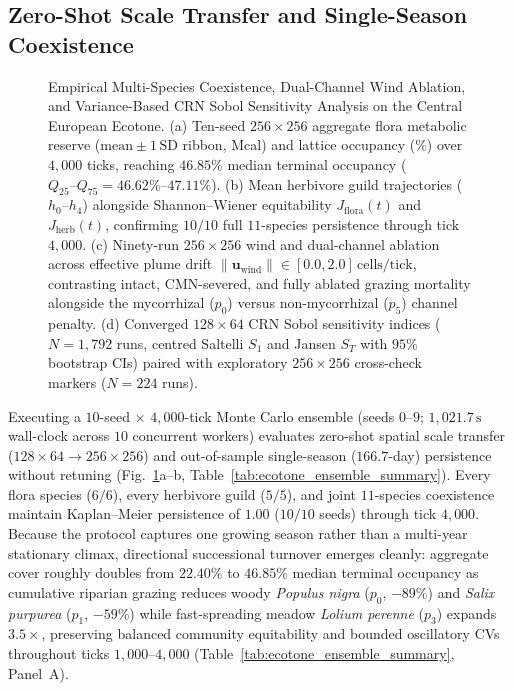 \subsection{Zero-Shot Scale Transfer and Single-Season Coexistence}
\label{sec:ecotone_coexistence}

\begin{figure}[t]
  \centering
  
  \caption{Empirical Multi-Species Coexistence, Dual-Channel Wind Ablation, and Variance-Based CRN Sobol Sensitivity Analysis on the Central European Ecotone. (a) Ten-seed $256 \times 256$ aggregate flora metabolic reserve ($\text{mean} \pm 1\,\text{SD}$ ribbon, Mcal) and lattice occupancy ($\%$) over $4{,}000$ ticks, reaching $46.85\%$ median terminal occupancy ($Q_{25}\text{--}Q_{75} = 46.62\%\text{--}47.11\%$). (b) Mean herbivore guild trajectories ($h_0$--$h_4$) alongside Shannon--Wiener equitability $J_{\mathrm{flora}}(t)$ and $J_{\mathrm{herb}}(t)$, confirming $10/10$ full $11$-species persistence through tick $4{,}000$. (c) Ninety-run $256 \times 256$ wind and dual-channel ablation across effective plume drift $\|\mathbf{u}_{\mathrm{wind}}\| \in [0.0, 2.0]\,\text{cells/tick}$, contrasting intact, CMN-severed, and fully ablated grazing mortality alongside the mycorrhizal ($p_0$) versus non-mycorrhizal ($p_5$) channel penalty. (d) Converged $128 \times 64$ CRN Sobol sensitivity indices ($N = 1{,}792$ runs, centred Saltelli $S_1$ and Jansen $S_T$ with $95\%$ bootstrap CIs) paired with exploratory $256 \times 256$ cross-check markers ($N = 224$ runs).}
  \label{fig:multispecies_coexistence}
\end{figure}

Executing a $10$-seed $\times$ $4{,}000$-tick Monte Carlo ensemble (seeds $0\text{--}9$; $1{,}021.7\,\text{s}$ wall-clock across $10$ concurrent workers) evaluates zero-shot spatial scale transfer ($128 \times 64 \to 256 \times 256$) and out-of-sample single-season ($166.7$-day) persistence without retuning (Fig.~\ref{fig:multispecies_coexistence}a--b, Table~\ref{tab:ecotone_ensemble_summary}). Every flora species ($6/6$), every herbivore guild ($5/5$), and joint $11$-species coexistence maintain Kaplan--Meier persistence of $1.00$ ($10/10$ seeds) through tick $4{,}000$. Because the protocol captures one growing season rather than a multi-year stationary climax, directional successional turnover emerges cleanly: aggregate cover roughly doubles from $22.40\%$ to $46.85\%$ median terminal occupancy as cumulative riparian grazing reduces woody \textit{Populus nigra} ($p_0$, $-89\%$) and \textit{Salix purpurea} ($p_1$, $-59\%$) while fast-spreading meadow \textit{Lolium perenne} ($p_3$) expands $3.5\times$, preserving balanced community equitability and bounded oscillatory CVs throughout ticks $1{,}000\text{--}4{,}000$ (Table~\ref{tab:ecotone_ensemble_summary}, Panel~A).

